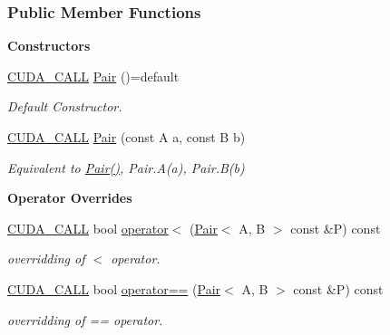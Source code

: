 \subsubsection*{Public Member Functions}
\begin{Indent}{\bf Constructors}\par
\begin{DoxyCompactItemize}
\item 
\hyperlink{Helper_8hpp_a0029886fd5e151820efb6eb46c000466}{C\+U\+D\+A\+\_\+\+C\+A\+LL} \hyperlink{classPair_ab76fff1f93ef8974bec7430bd67b916d}{Pair} ()=default
\begin{DoxyCompactList}\small\item\em Default Constructor. \end{DoxyCompactList}\item 
\hyperlink{Helper_8hpp_a0029886fd5e151820efb6eb46c000466}{C\+U\+D\+A\+\_\+\+C\+A\+LL} \hyperlink{classPair_addd8fa451e9cc9e1ab0ee13ccb130966}{Pair} (const A a, const B b)
\begin{DoxyCompactList}\small\item\em Equivalent to \hyperlink{classPair_ab76fff1f93ef8974bec7430bd67b916d}{Pair()}, Pair.\+A(a), Pair.\+B(b) \end{DoxyCompactList}\end{DoxyCompactItemize}
\end{Indent}
\begin{Indent}{\bf Operator Overrides}\par
\begin{DoxyCompactItemize}
\item 
\hyperlink{Helper_8hpp_a0029886fd5e151820efb6eb46c000466}{C\+U\+D\+A\+\_\+\+C\+A\+LL} bool \hyperlink{classPair_ab2e5000f2ce579285f773fafca762fb7}{operator$<$} (\hyperlink{classPair}{Pair}$<$ A, B $>$ const \&P) const 
\begin{DoxyCompactList}\small\item\em overridding of \textquotesingle{}$<$\textquotesingle{} operator. \end{DoxyCompactList}\item 
\hyperlink{Helper_8hpp_a0029886fd5e151820efb6eb46c000466}{C\+U\+D\+A\+\_\+\+C\+A\+LL} bool \hyperlink{classPair_a8e382aa87f8063084ecea74136a35ace}{operator==} (\hyperlink{classPair}{Pair}$<$ A, B $>$ const \&P) const 
\begin{DoxyCompactList}\small\item\em overridding of \textquotesingle{}==\textquotesingle{} operator. \end{DoxyCompactList}\end{DoxyCompactItemize}
\end{Indent}

